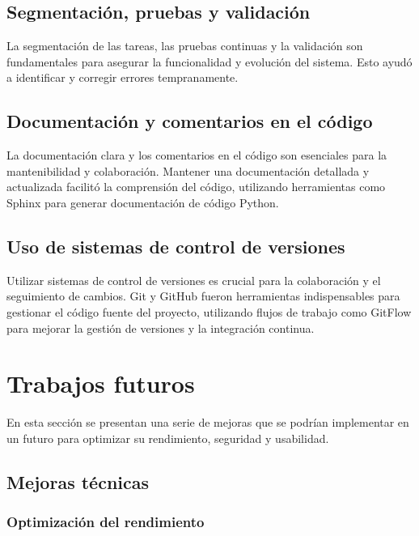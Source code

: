 \documentclass[a4paper, 12pt]{book}
\begin{document}
\subsection{Segmentación, pruebas y validación}
La segmentación de las tareas, las pruebas continuas y la validación son fundamentales para asegurar la funcionalidad y evolución del sistema. Esto ayudó a identificar y corregir errores tempranamente.


\subsection{Documentación y comentarios en el código}
La documentación clara y los comentarios en el código son esenciales para la mantenibilidad y colaboración. Mantener una documentación detallada y actualizada facilitó la comprensión del código, utilizando herramientas como Sphinx para generar documentación de código Python.

\subsection{Uso de sistemas de control de versiones}
Utilizar sistemas de control de versiones es crucial para la colaboración y el seguimiento de cambios. Git y GitHub fueron herramientas indispensables para gestionar el código fuente del proyecto, utilizando flujos de trabajo como GitFlow para mejorar la gestión de versiones y la integración continua.


\section{Trabajos futuros}
\label{sec:trabajos_futuros}

En esta sección se presentan una serie de mejoras que se podrían implementar en un futuro para optimizar su rendimiento, seguridad y usabilidad. 

\subsection{Mejoras técnicas}

\subsubsection{Optimización del rendimiento}
\end{document}

